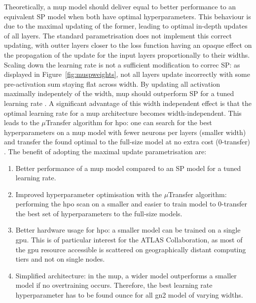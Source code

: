 Theoretically, a \gls{mup} model should deliver equal to better performance to an equivalent SP model when both have optimal hyperparameters. This behaviour is due to the maximal updating of the former, leading to optimal in-depth updates of all layers. The standard parametrisation does not implement this correct updating, with outter layers closer to the loss function having an opaque effect on the propagation of the update for the input layers proportionally to their widths. Scaling down the learning rate is not a sufficient modification to correc SP: as displayed in Figure~\ref{fig:muspweights}, not all layers update incorrectly with some pre-activation sum staying flat across width. By updating all activation maximally indepentely of the width, \gls{mup} should outperform SP for a tuned learning rate \cite{pmlr-v139-yang21c}. A significant advantage of this width independent effect is that the optimal learning rate for a \gls{mup} architecture becomes width-independent. This leads to the $\mu$Transfer algorithm for \gls{hpo}: one can search for the best hyperparameters on a \gls{mup} model with fewer neurons per layers (smaller width) and transfer the found optimal to the full-size model at no extra cost (0-transfer) \cite{yang2021tuning}. The benefit of adopting the maximal update parametrisation are:
\begin{enumerate}
  \item Better performance of a \gls{mup} model compared to an SP model for a tuned learning rate.
  \item Improved hyperparameter optimisation with the $\mu$Transfer algorithm: performing the \gls{hpo} scan on a smaller and easier to train model to 0-transfer the best set of hyperparameters to the full-size models. 
  \item Better hardware usage for \gls{hpo}: a smaller model can be trained on a single \gls{gpu}. This is of particular interest for the ATLAS Collaboration, as most of the \gls{gpu} resource accessible is scattered on geographically distant computing tiers and not on single nodes.  
  \item Simplified architecture: in the \gls{mup}, a wider model outperforms a smaller model if no overtraining occurs. Therefore, the best learning rate hyperparameter has to be found ounce for all \gls{gn2} model of varying widths.  
\end{enumerate}


